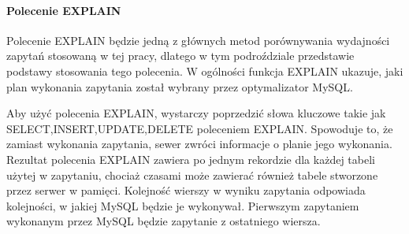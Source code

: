 \paragraph{Polecenie EXPLAIN}
Polecenie EXPLAIN będzie jedną z głównych metod porównywania wydajności zapytań stosowaną w tej pracy, dlatego w tym podroździale przedstawie podstawy stosowania tego polecenia. W ogólności funkcja EXPLAIN ukazuje, jaki plan wykonania zapytania został wybrany przez optymalizator MySQL.

Aby użyć polecenia EXPLAIN, wystarczy poprzedzić słowa kluczowe takie jak SELECT,INSERT,UPDATE,DELETE poleceniem EXPLAIN. Spowoduje to, że zamiast wykonania zapytania, sewer zwróci informacje o planie jego wykonania. Rezultat polecenia EXPLAIN zawiera po jednym rekordzie dla każdej tabeli użytej w zapytaniu, chociaż czasami może zawierać również tabele stworzone przez serwer w pamięci. Kolejność wierszy w wyniku zapytania odpowiada kolejności, w jakiej MySQL będzie je wykonywał. Pierwszym zapytaniem wykonanym przez MySQL będzie zapytanie z ostatniego wiersza.

